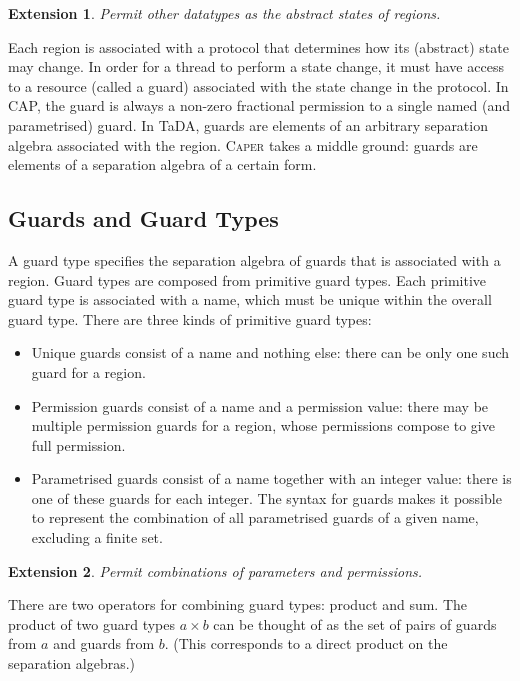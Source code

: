 \documentclass[a4paper]{article}
\newtheorem*{extension}{Extension}
\begin{document}
\begin{extension}
  Permit other datatypes as the abstract states of regions.
\end{extension}

Each region is associated with a protocol that determines how its (abstract) state may change.
In order for a thread to perform a state change, it must have access to a resource (called a guard) associated with the state change in the protocol.
In CAP, the guard is always a non-zero fractional permission to a single named (and parametrised) guard.
In TaDA, guards are elements of an arbitrary separation algebra associated with the region.
\textsc{Caper} takes a middle ground: guards are elements of a separation algebra of a certain form.

\subsection{Guards and Guard Types}

A guard type specifies the separation algebra of guards that is associated with a region.
Guard types are composed from primitive guard types.
Each primitive guard type is associated with a name, which must be unique within the overall guard type.
There are three kinds of primitive guard types:
\begin{itemize}
  \item Unique guards consist of a name and nothing else: there can be only one such guard for a region.
  \item Permission guards consist of a name and a permission value: there may be multiple permission guards for a region, whose permissions compose to give full permission.
  \item Parametrised guards consist of a name together with an integer value: there is one of these guards for each integer.
    The syntax for guards makes it possible to represent the combination of all parametrised guards of a given name, excluding a finite set.
\end{itemize}

\begin{extension}
  Permit combinations of parameters and permissions.
\end{extension}

There are two operators for combining guard types: product and sum.
The product of two guard types $a \times b$ can be thought of as the set of pairs of guards from $a$ and guards from $b$.
(This corresponds to a direct product on the separation algebras.)
\end{document}
